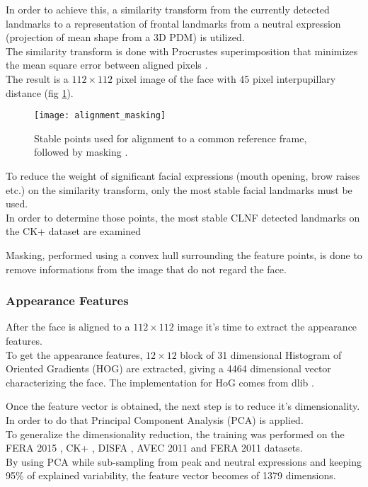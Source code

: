 In order to achieve this, a similarity transform from the currently detected landmarks to a representation of frontal landmarks from a neutral expression (projection of mean shape from a 3D PDM) is utilized. \\
The similarity transform is done with Procrustes superimposition that minimizes the mean square error between aligned pixels \cite{Baltru2013}.\\
The result is a $112 \times 112$ pixel image of the face with 45 pixel interpupillary distance (fig \ref{fig:alignment_masking}). 

\begin{figure}[H]
	\centering
	\texttt{[image: alignment\_masking]}
	\caption{Stable points used for alignment to a common reference frame, followed by masking \cite{Baltru2015}.}
	\label{fig:alignment_masking}
\end{figure}

To reduce the weight of significant facial expressions (mouth opening, brow raises etc.) on the similarity transform, only the most stable facial landmarks must be used. \\
In order to determine those points, the most stable CLNF detected landmarks on the CK+ dataset \cite{CK+} are examined

Masking, performed using a convex hull surrounding the feature points, is done to remove informations from the image that do not regard the face.

\subsubsection{Appearance Features}
After the face is aligned to a $112 \times 112$ image it's time to extract the appearance features. \\
To get the appearance features, $12 \times 12$ block of 31 dimensional Histogram of Oriented Gradients (HOG) are extracted, giving a 4464 dimensional vector characterizing the face. The implementation for HoG comes from dlib \cite{dlib}.

Once the feature vector is obtained, the next step is to reduce it's dimensionality. In order to do that Principal Component Analysis (PCA) is applied. \\
To generalize the dimensionality reduction, the training was performed on the FERA 2015 \cite{FERA15}, CK+ \cite{CK+}, DISFA \cite{DISFA}, AVEC 2011 \cite{AVEC11} and FERA 2011 \cite{FERA11} datasets. \\
By using PCA while sub-sampling from peak and neutral expressions and keeping 95\% of explained variability, the feature vector becomes of 1379 dimensions.

